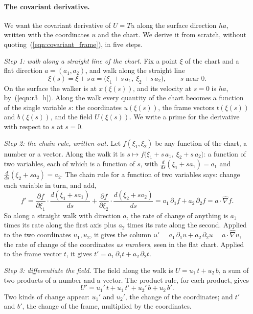 \paragraph{The covariant derivative.} We want the covariant derivative of $U = Tu$ along the surface direction $ha$, written with the coordinates $u$ and the chart. We derive it from scratch, without quoting~(\ref{eqn:covariant_frame}), in five steps.

\emph{Step 1: walk along a straight line of the chart.} Fix a point $\xi$ of the chart and a flat direction $a = (a_1, a_2)$, and walk along the straight line
\begin{equation*}
\xi(s) = \xi + s\,a = \big(\xi_1 + s\,a_1,\ \xi_2 + s\,a_2\big), \qquad s \text{ near } 0 .
\end{equation*}
On the surface the walker is at $x(\xi(s))$, and its velocity at $s = 0$ is $ha$, by~(\ref{eqn:r3_h}). Along the walk every quantity of the chart becomes a function of the single variable $s$: the coordinates $u(\xi(s))$, the frame vectors $t(\xi(s))$ and $b(\xi(s))$, and the field $U(\xi(s))$. We write a prime for the derivative with respect to $s$ at $s = 0$.

\emph{Step 2: the chain rule, written out.} Let $f(\xi_1, \xi_2)$ be any function of the chart, a number or a vector. Along the walk it is $s \mapsto f\big(\xi_1 + s\,a_1,\ \xi_2 + s\,a_2\big)$: a function of two variables, each of which is a function of $s$, with $\frac{d}{ds}(\xi_1 + s a_1) = a_1$ and $\frac{d}{ds}(\xi_2 + s a_2) = a_2$. The chain rule for a function of two variables says: change each variable in turn, and add,
\begin{equation}
\label{eqn:s3a_chain}
f' = \frac{\partial f}{\partial\xi_1}\cdot\frac{d(\xi_1 + s a_1)}{ds} + \frac{\partial f}{\partial\xi_2}\cdot\frac{d(\xi_2 + s a_2)}{ds} = a_1\,\partial_1 f + a_2\,\partial_2 f = a\cdot\hat\nabla f .
\end{equation}
So along a straight walk with direction $a$, the rate of change of anything is $a_1$ times its rate along the first axis plus $a_2$ times its rate along the second. Applied to the two coordinates $u_1, u_2$, it gives the column $u' = a_1\,\partial_1u + a_2\,\partial_2u = a\cdot\hat\nabla u$, the rate of change of the coordinates \emph{as numbers}, seen in the flat chart. Applied to the frame vector $t$, it gives $t' = a_1\,\partial_1t + a_2\,\partial_2t$.

\emph{Step 3: differentiate the field.} The field along the walk is $U = u_1\, t + u_2\, b$, a sum of two products of a number and a vector. The product rule, for each product, gives
\begin{equation*}
U' = u_1'\, t + u_1\, t' + u_2'\, b + u_2\, b' .
\end{equation*}
Two kinds of change appear: $u_1'$ and $u_2'$, the change of the coordinates; and $t'$ and $b'$, the change of the frame, multiplied by the coordinates.

